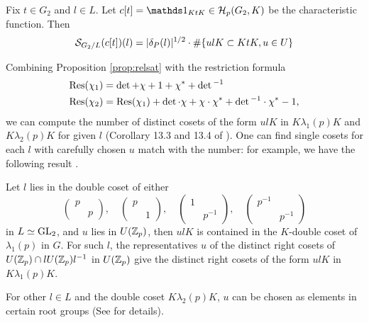 \begin{proposition}
\label{prop:relsat}
Fix $t \in G_2$ and $l \in L$.
Let $c[t] = \dso_{KtK} \in \cH_p(G_2, K)$ be the characteristic function.
Then
\begin{align*}
\mathcal{S}_{G_2 / L}(c[t])(l) = |\delta_P(l)|^{1/2} \cdot \#\{ulK \subset KtK, u \in U\}
\end{align*}
\end{proposition}
Combining Proposition \ref{prop:relsat} with the restriction formula
\begin{align*}
    \mathrm{Res}(\chi_1) &= \det + \chi + 1 + \chi^\ast + \det{}^{-1} \\
    \mathrm{Res}(\chi_2) &= \mathrm{Res}(\chi_1) + \det \cdot \chi + \chi \cdot \chi^\ast + \det{}^{-1} \cdot \chi^\ast - 1,
\end{align*}
we can compute the number of distinct cosets of the form $ulK$ in $K\lambda_1(p)K$ and $K\lambda_2(p)K$ for given $l$ (Corollary 13.3 and 13.4 of \cite{gan2002fourier}).
One can find single cosets for each $l$ with carefully chosen $u$ match with the number: for example, we have the following result \cite[Proposition 14.2]{gan2002fourier}.

\begin{proposition}
Let $l$ lies in the double coset of either
$$
   \begin{pmatrix}
       p & \\ & p
   \end{pmatrix}, \quad
   \begin{pmatrix}
       p & \\ & 1
   \end{pmatrix}, \quad
   \begin{pmatrix}
       1 & \\ & p^{-1}
   \end{pmatrix}, \quad
   \begin{pmatrix}
       p^{-1} & \\ & p^{-1}
   \end{pmatrix}
$$
in $L \simeq \mathrm{GL}_2$, and $u$ lies in $U(\mathbb{Z}_p)$, then $ulK$ is contained in the $K$-double coset of $\lambda_1(p)$ in $G$.
For such $l$, the representatives $u$ of the distinct right cosets of $U(\mathbb{Z}_p) \cap l U(\mathbb{Z}_p) l^{-1}$ in $U(\mathbb{Z}_p)$ give the distinct right cosets of the form $ulK$ in $K \lambda_1(p) K$.
\end{proposition}
For other $l \in L$ and the double coset $K \lambda_2(p) K$, $u$ can be chosen as elements in certain root groups (See \cite[Section 14]{gan2002fourier} for details).
